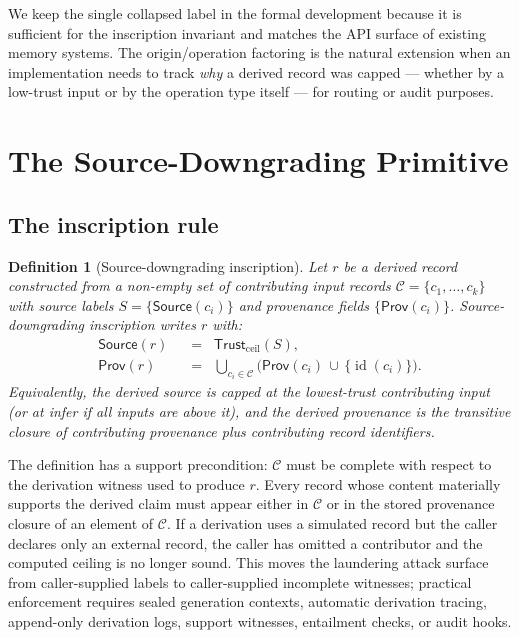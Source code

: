 \documentclass[11pt]{article}
\newtheorem{definition}{Definition}
\newcommand{\Source}{\mathsf{Source}}
\newcommand{\Trust}{\mathsf{Trust}}
\newcommand{\Prov}{\mathsf{Prov}}
\begin{document}
We keep the single collapsed label in the formal development because it is sufficient for the inscription invariant and matches the API surface of existing memory systems. The origin/operation factoring is the natural extension when an implementation needs to track \emph{why} a derived record was capped --- whether by a low-trust input or by the operation type itself --- for routing or audit purposes.

\section{The Source-Downgrading Primitive}
\label{sec:primitive}

\subsection{The inscription rule}

\begin{definition}[Source-downgrading inscription]
\label{def:downgrade}
Let $r$ be a derived record constructed from a non-empty set of contributing input records $\mathcal{C} = \{c_1, \ldots, c_k\}$ with source labels $S = \{\Source(c_i)\}$ and provenance fields $\{\Prov(c_i)\}$. Source-downgrading inscription writes $r$ with:
\begin{align}
\Source(r)\;\;&=\;\;\Trust_{\text{ceil}}(S), \\
\Prov(r)\;\;&=\;\; \bigcup_{c_i \in \mathcal{C}} \bigl(\Prov(c_i)\, \cup\, \{\operatorname{id}(c_i)\}\bigr).
\end{align}
Equivalently, the derived source is capped at the lowest-trust contributing input (or at \emph{infer} if all inputs are above it), and the derived provenance is the transitive closure of contributing provenance plus contributing record identifiers.
\end{definition}

The definition has a support precondition: $\mathcal{C}$ must be complete with respect to the derivation witness used to produce $r$. Every record whose content materially supports the derived claim must appear either in $\mathcal{C}$ or in the stored provenance closure of an element of $\mathcal{C}$. If a derivation uses a simulated record but the caller declares only an external record, the caller has omitted a contributor and the computed ceiling is no longer sound. This moves the laundering attack surface from caller-supplied labels to caller-supplied incomplete witnesses; practical enforcement requires sealed generation contexts, automatic derivation tracing, append-only derivation logs, support witnesses, entailment checks, or audit hooks.
\end{document}
